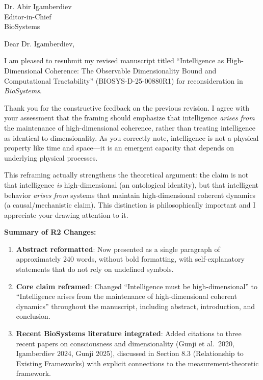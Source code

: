 \documentclass[11pt]{letter}
\begin{document}
\begin{letter}{Dr. Abir Igamberdiev\\Editor-in-Chief\\BioSystems}

\opening{Dear Dr. Igamberdiev,}

I am pleased to resubmit my revised manuscript titled ``Intelligence as High-Dimensional Coherence: The Observable Dimensionality Bound and Computational Tractability'' (BIOSYS-D-25-00880R1) for reconsideration in \textit{BioSystems}.

Thank you for the constructive feedback on the previous revision. I agree with your assessment that the framing should emphasize that intelligence \textit{arises from} the maintenance of high-dimensional coherence, rather than treating intelligence as identical to dimensionality. As you correctly note, intelligence is not a physical property like time and space---it is an emergent capacity that depends on underlying physical processes.

This reframing actually strengthens the theoretical argument: the claim is not that intelligence \textit{is} high-dimensional (an ontological identity), but that intelligent behavior \textit{arises from} systems that maintain high-dimensional coherent dynamics (a causal/mechanistic claim). This distinction is philosophically important and I appreciate your drawing attention to it.

\textbf{Summary of R2 Changes:}

\begin{enumerate}
\item \textbf{Abstract reformatted}: Now presented as a single paragraph of approximately 240 words, without bold formatting, with self-explanatory statements that do not rely on undefined symbols.

\item \textbf{Core claim reframed}: Changed ``Intelligence must be high-dimensional'' to ``Intelligence arises from the maintenance of high-dimensional coherent dynamics'' throughout the manuscript, including abstract, introduction, and conclusion.

\item \textbf{Recent BioSystems literature integrated}: Added citations to three recent papers on consciousness and dimensionality (Gunji et al.\ 2020, Igamberdiev 2024, Gunji 2025), discussed in Section 8.3 (Relationship to Existing Frameworks) with explicit connections to the measurement-theoretic framework.


\end{enumerate}
\end{letter}
\end{document}
